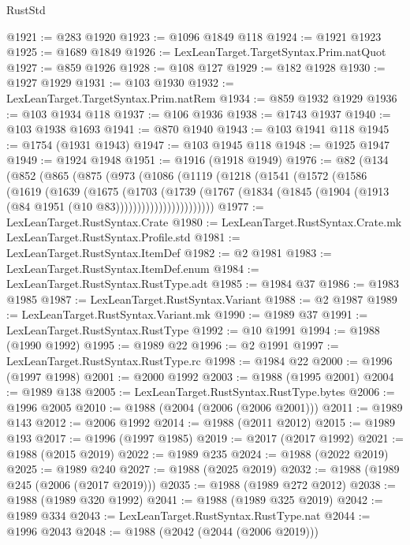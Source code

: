 \begin{lexlean}{RustStd}
\begin{coremodule}
@1921 := @283 @1920
@1923 := @1096 @1849 @118
@1924 := @1921 @1923
@1925 := @1689 @1849
@1926 := LexLeanTarget.TargetSyntax.Prim.natQuot
@1927 := @859 @1926
@1928 := @108 @127
@1929 := @182 @1928
@1930 := @1927 @1929
@1931 := @103 @1930
@1932 := LexLeanTarget.TargetSyntax.Prim.natRem
@1934 := @859 @1932 @1929
@1936 := @103 @1934 @118
@1937 := @106 @1936
@1938 := @1743 @1937
@1940 := @103 @1938 @1693
@1941 := @870 @1940
@1943 := @103 @1941 @118
@1945 := @1754 (@1931 @1943)
@1947 := @103 @1945 @118
@1948 := @1925 @1947
@1949 := @1924 @1948
@1951 := @1916 (@1918 @1949)
@1976 := @82
    (@134
      (@852
        (@865
          (@875
            (@973
              (@1086
                (@1119
                  (@1218
                    (@1541
                      (@1572
                        (@1586
                          (@1619
                            (@1639
                              (@1675
                                (@1703
                                  (@1739
                                    (@1767
                                      (@1834
                                        (@1845
                                          (@1904 (@1913 (@84 @1951 (@10 @83)))))))))))))))))))))))
@1977 := LexLeanTarget.RustSyntax.Crate
@1980 := LexLeanTarget.RustSyntax.Crate.mk LexLeanTarget.RustSyntax.Profile.std
@1981 := LexLeanTarget.RustSyntax.ItemDef
@1982 := @2 @1981
@1983 := LexLeanTarget.RustSyntax.ItemDef.enum
@1984 := LexLeanTarget.RustSyntax.RustType.adt
@1985 := @1984 @37
@1986 := @1983 @1985
@1987 := LexLeanTarget.RustSyntax.Variant
@1988 := @2 @1987
@1989 := LexLeanTarget.RustSyntax.Variant.mk
@1990 := @1989 @37
@1991 := LexLeanTarget.RustSyntax.RustType
@1992 := @10 @1991
@1994 := @1988 (@1990 @1992)
@1995 := @1989 @22
@1996 := @2 @1991
@1997 := LexLeanTarget.RustSyntax.RustType.rc
@1998 := @1984 @22
@2000 := @1996 (@1997 @1998)
@2001 := @2000 @1992
@2003 := @1988 (@1995 @2001)
@2004 := @1989 @138
@2005 := LexLeanTarget.RustSyntax.RustType.bytes
@2006 := @1996 @2005
@2010 := @1988 (@2004 (@2006 (@2006 @2001)))
@2011 := @1989 @143
@2012 := @2006 @1992
@2014 := @1988 (@2011 @2012)
@2015 := @1989 @193
@2017 := @1996 (@1997 @1985)
@2019 := @2017 (@2017 @1992)
@2021 := @1988 (@2015 @2019)
@2022 := @1989 @235
@2024 := @1988 (@2022 @2019)
@2025 := @1989 @240
@2027 := @1988 (@2025 @2019)
@2032 := @1988 (@1989 @245 (@2006 (@2017 @2019)))
@2035 := @1988 (@1989 @272 @2012)
@2038 := @1988 (@1989 @320 @1992)
@2041 := @1988 (@1989 @325 @2019)
@2042 := @1989 @334
@2043 := LexLeanTarget.RustSyntax.RustType.nat
@2044 := @1996 @2043
@2048 := @1988 (@2042 (@2044 (@2006 @2019)))

\end{coremodule}
\end{lexlean}
